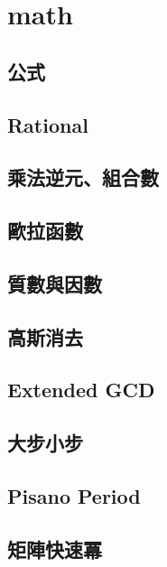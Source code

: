 \section{math}
    \subsection{公式}
        
    \subsection{Rational}
        
    \subsection{乘法逆元、組合數}
        
    \subsection{歐拉函數}
    \subsection{質數與因數}
        
    \subsection{高斯消去}
        
    \subsection{Extended GCD}
    \subsection{大步小步}
    \subsection{Pisano Period}
        
    \subsection{矩陣快速冪}
         

